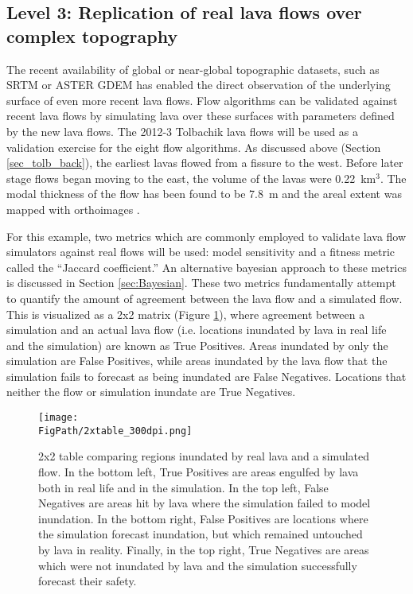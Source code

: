 	\subsection{Level 3: Replication of real lava flows over complex topography}\label{sec_tolb_bench}
		The recent availability of global or near-global topographic datasets, such as SRTM or ASTER GDEM has enabled the direct observation of the underlying surface of even more recent lava flows. Flow algorithms can be validated against recent lava flows by simulating lava over these surfaces with parameters defined by the new lava flows. The 2012-3 Tolbachik lava flows will be used as a validation exercise for the eight flow algorithms. As discussed above (Section \ref{sec_tolb_back}), the earliest lavas flowed from a fissure to the west. Before later stage flows began moving to the east, the volume of the lavas were 0.22~km$^3$. The modal thickness of the flow has been found to be 7.8~m and the areal extent was mapped with orthoimages \citep{kubanek2015lava}.

		For this example, two metrics which are commonly employed to validate lava flow simulators against real flows will be used: model sensitivity and a fitness metric called the ``Jaccard coefficient.'' An alternative bayesian approach to these metrics is discussed in Section \ref{sec:Bayesian}. These two metrics fundamentally attempt to quantify the amount of agreement between the lava flow and a simulated flow. This is visualized as a 2x2 matrix (Figure \ref{fig_2x2}), where agreement between a simulation and an actual lava flow (i.e. locations inundated by lava in real life and the simulation) are known as True Positives. Areas inundated by only the simulation are False Positives, while areas inundated by the lava flow that the simulation fails to forecast as being inundated are False Negatives. Locations that neither the flow or simulation inundate are True Negatives. 
		
		
\begin{figure}
			\centering
			\texttt{[image: \\FigPath/2xtable\_300dpi.png]}
			\caption[2x2 table comparing regions inundated by real lava and a simulated flow]{2x2 table comparing regions inundated by real lava and a simulated flow. In the bottom left, True Positives are areas engulfed by lava both in real life and in the simulation. In the top left, False Negatives are areas hit by lava where the simulation failed to model inundation. In the bottom right, False Positives are locations where the simulation forecast inundation, but which remained untouched by lava in reality. Finally, in the top right, True Negatives are areas which were not inundated by lava and the simulation successfully forecast their safety.}
			\label{fig_2x2}
		\end{figure}
		
